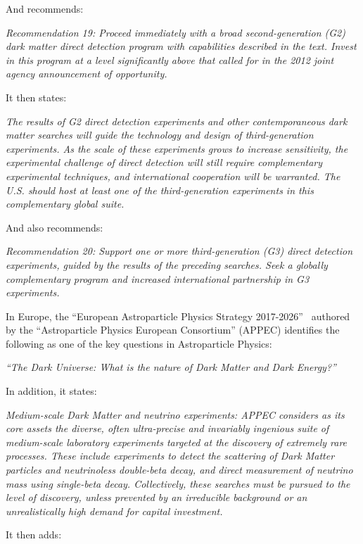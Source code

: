 And recommends:

{\it Recommendation 19: Proceed immediately with a broad second-generation (G2) dark matter direct detection program with capabilities described in the text.  Invest in this program at a level significantly above that called for in the 2012 joint agency announcement of opportunity.}

It then states:

{\it The results of G2 direct detection experiments and other contemporaneous dark matter searches will guide the technology and design of third-generation experiments.  As the scale of these experiments grows to increase sensitivity, the experimental challenge of direct detection will still require complementary experimental techniques, and international cooperation will be warranted.  The U.S. should host at least one of the third-generation experiments in this complementary global suite.}

And also recommends:

{\it Recommendation 20: Support one or more third-generation (G3) direct detection experiments, guided by the results of the preceding searches.  Seek a globally complementary program and increased international partnership in G3 experiments.}

In Europe, the ``European Astroparticle Physics Strategy 2017-2026''~\cite{AstroparticlePhysicsEuropeanConsortium:2017wy} authored by the ``Astroparticle Physics European Consortium'' (APPEC) identifies the following as one of the key questions in Astroparticle Physics:

{\it ``The Dark Universe: What is the nature of Dark Matter and Dark Energy?''}

In addition, it states:

{\it Medium-scale Dark Matter and neutrino experiments: APPEC considers as its core assets the diverse, often ultra-precise and invariably ingenious suite of medium-scale laboratory experiments targeted at the discovery of extremely rare processes.  These include experiments to detect the scattering of Dark Matter particles and neutrinoless double-beta decay, and direct measurement of neutrino mass using single-beta decay.  Collectively, these searches must be pursued to the level of discovery, unless prevented by an irreducible background or an unrealistically high demand for capital investment.}

It then adds:

